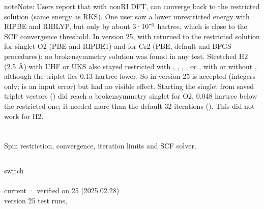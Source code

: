 \documentclass[letterpaper,10pt,english,openany,oneside]{sphinxmanual}
\begin{document}
\begin{sphinxadmonition}{note}{Note:}
\sphinxAtStartPar
Users report that with non\sphinxhyphen{}RI DFT,  can converge back to the restricted solution (same energy as
RKS). One user saw a lower unrestricted energy with RI\sphinxhyphen{}PBE and RI\sphinxhyphen{}BLYP, but only by about 3·10⁻\(\sp{\text{6}}\) hartree,
which is close to the SCF convergence threshold. In version 25,  with
 returned to the restricted solution for singlet O2 (PBE and RI\sphinxhyphen{}PBE1) and for Cr2 (PBE, default
and BFGS procedures): no broken\sphinxhyphen{}symmetry solution was found in any test. Stretched H2 (2.5 Å) with UHF or
UKS also stayed restricted with , , , ,  or , with or without , although
the triplet lies 0.13 hartree lower. So in version 25  is accepted (integers only;  is an
input error) but had no visible effect. Starting the singlet from saved triplet vectors () did reach
a broken\sphinxhyphen{}symmetry singlet for O2, 0.048 hartree below the restricted one; it needed more than the default 32
iterations (). This did not work for H2.
\end{sphinxadmonition}

\sphinxAtStartPar
{} {\hyperref[\detokenize{reference/scf:scf-restrict}]{}}

\sphinxstepscope




\section{}
\label{\detokenize{reference/scf:scf}}\label{\detokenize{reference/scf:group-scf}}\label{\detokenize{reference/scf::doc}}
\ignorespaces 
\sphinxAtStartPar
Spin restriction, convergence, iteration limits and SCF solver.


\subsection{}
\label{\detokenize{reference/scf:restrict}}\label{\detokenize{reference/scf:scf-restrict}}
\ignorespaces 
\sphinxAtStartPar
{} switch\\
 \\
 current · verified on 25 (2025.02.28)\\
 version 25 test runs, 
\end{document}
